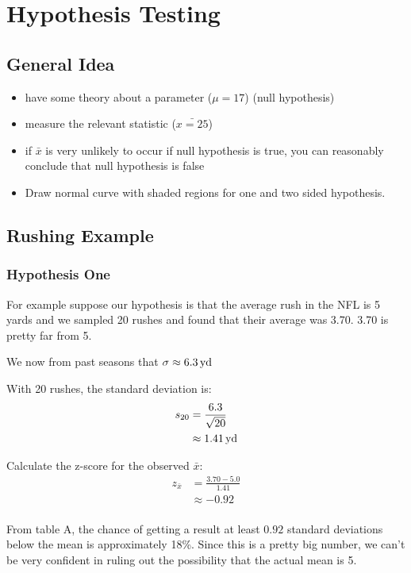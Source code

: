 \documentclass[landscape]{exam}
\begin{document}
  \section{Hypothesis Testing}

  \subsection{General Idea}
  \begin{itemize}
    \item have some theory about a parameter ($\mu = 17$) (null hypothesis)
    \item measure the relevant statistic ($\bar{x = 25}$)
    \item if $\bar{x}$ is very unlikely to occur if null hypothesis is true, you
      can reasonably conclude that null hypothesis is false
    \item Draw normal curve with shaded regions for one and two sided
      hypothesis.
  \end{itemize}

  \subsection{Rushing Example}

  \subsubsection{Hypothesis One}
  For example suppose our hypothesis is that the average rush in the NFL is 5
  yards and we sampled 20 rushes and found that their average was 3.70. 3.70 is
  pretty far from 5.

  We now from past seasons that $\sigma \approx \unit[6.3]{yd}$

  With 20 rushes, the standard deviation is:
  \begin{align*}
    s_{20} & = \frac{6.3}{\sqrt{20}} \\
           & \approx \unit[1.41]{yd} \\
  \end{align*}

  Calculate the z-score for the observed $\bar{x}$:
  \begin{align*}
    z_{\bar{x}} & = \frac{3.70 - 5.0}{1.41} \\
                & \approx -0.92 \\
  \end{align*}

  From table A, the chance of getting a result at least $0.92$ standard
  deviations below the mean is approximately 18\%. Since this is a pretty big
  number, we can't be very confident in ruling out the possibility that the
  actual mean is 5.
\end{document}
